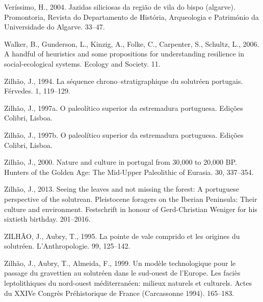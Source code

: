 \documentclass[12pt,twoside]{reedthesis}
\begin{document}
\leavevmode\hypertarget{ref-verissimo2004}{}%
Veríssimo, H., 2004. Jazidas siliciosas da região de vila do bispo (algarve). Promontoria, Revista do Departamento de História, Arqueologia e Património da Universidade do Algarve. 33--47.

\leavevmode\hypertarget{ref-walker2006}{}%
Walker, B., Gunderson, L., Kinzig, A., Folke, C., Carpenter, S., Schultz, L., 2006. A handful of heuristics and some propositions for understanding resilience in social-ecological systems. Ecology and Society. 11.

\leavevmode\hypertarget{ref-zilhao1994}{}%
Zilhão, J., 1994. La séquence chrono--stratigraphique du solutréen portugais. Férvedes. 1, 119--129.

\leavevmode\hypertarget{ref-zilhao1997}{}%
Zilhão, J., 1997a. O paleolítico superior da estremadura portuguesa. Edições Colibri, Lisboa.

\leavevmode\hypertarget{ref-zilhao1997b}{}%
Zilhão, J., 1997b. O paleolítico superior da estremadura portuguesa. Edições Colibri, Lisboa.

\leavevmode\hypertarget{ref-zilhao2000}{}%
Zilhão, J., 2000. Nature and culture in portugal from 30,000 to 20,000 BP. Hunters of the Golden Age: The Mid-Upper Paleolithic of Eurasia. 30, 337--354.

\leavevmode\hypertarget{ref-zilhao2013}{}%
Zilhão, J., 2013. Seeing the leaves and not missing the forest: A portuguese perspective of the solutrean. Pleistocene foragers on the Iberian Peninsula: Their culture and environment. Festschrift in honour of Gerd-Christian Weniger for his sixtieth birthday. 201--2016.

\leavevmode\hypertarget{ref-zilhaoetal1995}{}%
ZILHÃO, J., Aubry, T., 1995. La pointe de vale comprido et les origines du solutréen. L'Anthropologie. 99, 125--142.

\leavevmode\hypertarget{ref-zilhaoetal1999}{}%
Zilhão, J., Aubry, T., Almeida, F., 1999. Un modèle technologique pour le passage du gravettien au solutréen dans le sud-ouest de l'Europe. Les faciès leptolithiques du nord-ouest méditerranéen: milieux naturels et culturels. Actes du XXIVe Congrès Préhistorique de France (Carcassonne 1994). 165--183.

\appendix
\end{document}
